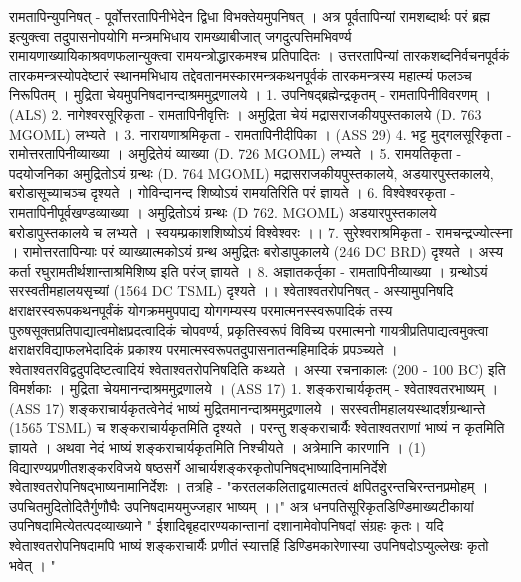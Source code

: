 रामतापिन्युपनिषत् -
पूर्वोत्तरतापिनीभेदेन द्विधा विभक्तेयमुपनिषत् । अत्र पूर्वतापिन्यां रामशब्दार्थः परं ब्रह्म इत्युक्त्वा तदुपासनोपयोगि मन्त्रमभिधाय रामख्याबीजात् जगदुत्पत्तिमभिवर्ण्य रामायणाख्यायिकाश्रवणफलान्युक्त्वा रामयन्त्रोद्धारकमश्च प्रतिपादितः । उत्तरतापिन्यां तारकशब्दनिर्वचनपूर्वकं तारकमन्त्रस्योपदेष्टारं स्थानमभिधाय तद्देवतानमस्कारमन्त्रकथनपूर्वकं तारकमन्त्रस्य महात्म्यं फलञ्च निरूपितम् । मुद्रिता चेयमुपनिषदानन्दाश्रममुद्रणालये । 
1. उपनिषद्ब्रह्मेन्द्रकृतम् - रामतापिनीविवरणम् । (ALS) 
2. नागेश्वरसूरिकृता - रामतापिनीवृत्तिः । अमुद्रिता चेयं मद्रासराजकीयपुस्तकालये (D. 763 MGOML) लभ्यते । 
3. नारायणाश्रमिकृता - रामतापिनीदीपिका । (ASS 29)
4. भट्ट मुद्गलसूरिकृता - रामोत्तरतापिनीव्याख्या । अमुद्रितेयं व्याख्या (D. 726 MGOML) लभ्यते । 
5. रामयतिकृता - पदयोजनिका  
अमुद्रितोऽयं ग्रन्थः (D. 764 MGOML) मद्रासराजकीयपुस्तकालये, अडयारपुस्तकालये, बरोडासूच्याचञ्च दृश्यते । गोविन्दानन्द शिष्योऽयं रामयतिरिति परं ज्ञायते । 
6. विश्वेश्वरकृता - रामतापिनीपूर्वखण्डव्याख्या । 
अमुद्रितोऽयं ग्रन्थः (D 762. MGOML) अडयारपुस्तकालये बरोडापुस्तकालये च लभ्यते । स्वयम्प्रकाशशिष्योऽयं विश्वेश्वरः ।।
7. सुरेश्वराश्रमिकृता - रामचन्द्रज्योत्स्ना । 
रामोत्तरतापिन्याः परं व्याख्यात्मकोऽयं ग्रन्थ अमुद्रितः बरोडापुकालये (246 DC BRD) दृश्यते । अस्य कर्ता रघुरामतीर्थशान्ताश्रमिशिष्य इति परंज् ज्ञायते । 
8. अज्ञातकर्तृका - रामतापिनीव्याख्या । ग्रन्थोऽयं सरस्वतीमहालयसृच्यां (1564 DC TSML) दृश्यते ।। 
श्वेताश्वतरोपनिषत् - 
अस्यामुपनिषदि क्षराक्षरस्वरूपकथनपूर्वंकं योगक्रममुपपाद्य योगगम्यस्य परमात्मनस्स्वरूपादिकं तस्य पुरुषसूक्तप्रतिपाद्यात्वमोक्षप्रदत्वादिकं चोपवर्ण्य, प्रकृतिस्वरूपं विविच्य परमात्मनो गायत्रीप्रतिपाद्यत्वमुक्त्वा क्षराक्षरविद्याफलभेदादिकं प्रकाश्य परमात्मस्वरूपतदुपासनातन्महिमादिकं प्रपञ्च्यते । श्वेताश्वतरविद्वदुपदिष्टत्वादियं श्वेताश्वतरोपनिषदिति कथ्यते । अस्या रचनाकालः (200 - 100 BC)  इति विमर्शकाः । मुद्रिता चेयमानन्दाश्रममुद्रणालये । (ASS 17) 
1. शङ्कराचार्यकृतम् - श्वेताश्वतरभाष्यम् । (ASS 17)
शङ्कराचार्यकृतत्वेनेदं भाष्यं मुद्रितमानन्दाश्रममुद्रणालये । सरस्वतीमहालयस्थादर्शग्रन्थान्ते (1565 TSML) च शङ्कराचार्यकृतमिति दृश्यते । परन्तु शङ्कराचार्यैः श्वेताश्वतराणां भाष्यं न कृतमिति ज्ञायते । अथवा नेदं भाष्यं शङ्कराचार्यकृतमिति निश्चीयते । अत्रेमानि कारणानि । 
(1) विद्यारण्यप्रणीतशङ्करविजये षष्ठसर्गे आचार्यशङ्करकृतोपनिषद्भाष्यादिनामनिर्देशे श्वेताश्वतरोपनिषद्भाष्यनामानिर्देशः । तत्रहि - 
"करतलकलिताद्वयात्मतत्वं क्षपितदुरन्तचिरन्तनप्रमोहम् ।
उपचितमुदितोदितैर्गुणौघैः उपनिषदामयमुज्जहार भाष्यम् ।।"
अत्र धनपतिसूरिकृतडिण्डिमाख्यटीकायां उपनिषदामित्येतत्पदव्याख्याने " ईशादिबृहदारण्यकान्तानां दशानामेवोपनिषदां संग्रहः कृतः। यदि श्वेताश्वतरोपनिषदामपि भाष्यं शङ्कराचार्यैः प्रणीतं स्यात्तर्हि डिण्डिमकारेणास्या उपनिषदोऽप्युल्लेखः कृतो भवेत् । "
